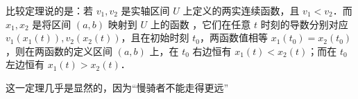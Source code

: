 
比较定理说的是：若 $v_1,v_2$ 是实轴区间 $U$ 上定义的两实连续函数，且 $v_1<v_2$．而 $x_1,x_2$ 是将区间 $(a,b)$ 映射到 $U$ 上的函数 ，它们在任意 $t$ 时刻的导数分别对应 $v_1(x_1(t)),v_2(x_2(t))$，且在初始时刻 $t_0$，两函数值相等 $x_1(t_0)=x_2(t_0)$，则在两函数的定义区间 $(a,b)$ 上，在 $t_0$ 右边恒有 $x_1(t)<x_2(t)$；而在 $t_0$ 左边恒有 $x_1(t)>x_2(t)$．

这一定理几乎是显然的，因为“慢骑者不能走得更远”
